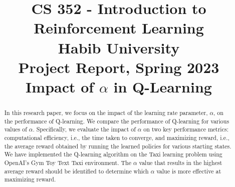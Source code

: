 \documentclass[conference]{IEEEtran}
\begin{document}
\title{CS 352 - Introduction to Reinforcement Learning \\ Habib University \\ {\large Project Report, Spring 2023} \\ {\LARGE Impact of $\alpha$ in Q-Learning}}


\author{
\and
{}
}

\maketitle

\begin{abstract}
 In this research paper, we focus on the impact of the learning rate parameter, $\alpha$, on the performance of Q-learning. We compare the performance of Q-learning for various values of $\alpha$. Specifically, we evaluate the impact of $\alpha$ on two key performance metrics: computational efficiency, i.e., the time taken to converge, and maximizing reward, i.e., the average reward obtained by running the learned policies for various starting states. We have implemented the Q-learning algorithm on the Taxi learning problem using OpenAI's Gym Toy Text Taxi environment. The $\alpha$ value that results in the highest average reward should be identified to determine which $\alpha$ value is more effective at maximizing reward. 
 \newline
\end{abstract}
\end{document}
